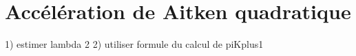 \section{Accélération de Aitken quadratique}
	
	1) estimer lambda 2
	2) utiliser formule du calcul de piKplus1
